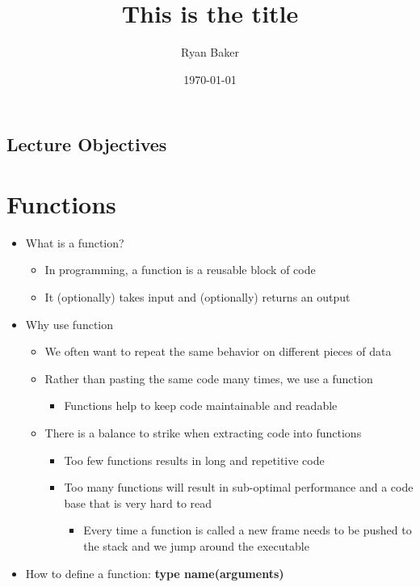 \documentclass{article}
\title{This is the title}
\author{Ryan Baker}
\date{\today}
\begin{document}
\maketitle
\tableofcontents
\pagebreak

\subsection*{Lecture Objectives}

\section{Functions}

\begin{itemize}
	\item What is a function?
	\begin{itemize}
		\item In programming, a function is a reusable block of code
		\item It (optionally) takes input and (optionally) returns an output
	\end{itemize}
	\item Why use function
	\begin{itemize}
		\item We often want to repeat the same behavior on different pieces of data
		\item Rather than pasting the same code many times, we use a function
		\begin{itemize}
			\item Functions help to keep code maintainable and readable
		\end{itemize}
		\item There is a balance to strike when extracting code into functions
		\begin{itemize}
			\item Too few functions results in long and repetitive code
			\item Too many functions will result in sub-optimal performance and a code base that is very hard to read \begin{itemize}
				\item Every time a function is called a new frame needs to be pushed to the stack and we jump around the executable
			\end{itemize}
		\end{itemize}
	\end{itemize}
	\item How to define a function: \textbf{type name(arguments)}

\end{itemize}
\end{document}

